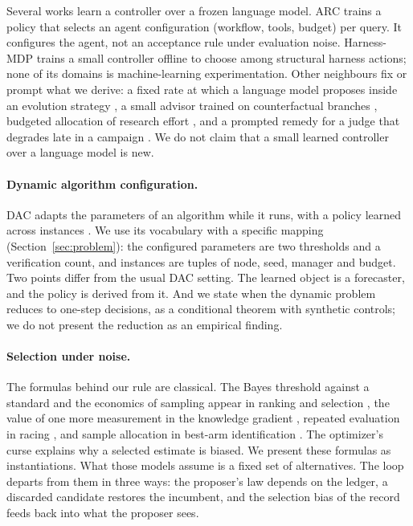 Several works learn a controller over a frozen language model. ARC \citep{arxiv260211574} trains a policy that selects an agent configuration (workflow, tools, budget) per query. It configures the agent, not an acceptance rule under evaluation noise. Harness-MDP \citep{yi2026harnessmdp} trains a small controller offline to choose among structural harness actions; none of its domains is machine-learning experimentation. Other neighbours fix or prompt what we derive: a fixed rate at which a language model proposes inside an evolution strategy \citep{ferreira2026centaur}, a small advisor trained on counterfactual branches \citep{jiang2026cota}, budgeted allocation of research effort \citep{yu2026primescientist}, and a prompted remedy for a judge that degrades late in a campaign \citep{ji2026rehearse}. We do not claim that a small learned controller over a language model is new.

\paragraph{Dynamic algorithm configuration.}
DAC adapts the parameters of an algorithm while it runs, with a policy learned across instances \citep{biedenkapp2020dac,adriaensen2022dac,eimer2021dacbench}. We use its vocabulary with a specific mapping (Section~\ref{sec:problem}): the configured parameters are two thresholds and a verification count, and instances are tuples of node, seed, manager and budget. Two points differ from the usual DAC setting. The learned object is a forecaster, and the policy is derived from it. And we state when the dynamic problem reduces to one-step decisions, as a conditional theorem with synthetic controls; we do not present the reduction as an empirical finding.

\paragraph{Selection under noise.}
The formulas behind our rule are classical. The Bayes threshold against a standard and the economics of sampling appear in ranking and selection \citep{xie2013sequential,chick2012sequential}, the value of one more measurement in the knowledge gradient \citep{frazier2008knowledge}, repeated evaluation in racing \citep{birattari2002frace,lopezibanez2016irace}, and sample allocation in best-arm identification \citep{audibert2010bestarm,kaufmann2016bestarm}. The optimizer's curse \citep{smith2006optimizer} explains why a selected estimate is biased. We present these formulas as instantiations. What those models assume is a fixed set of alternatives. The loop departs from them in three ways: the proposer's law depends on the ledger, a discarded candidate restores the incumbent, and the selection bias of the record feeds back into what the proposer sees.
